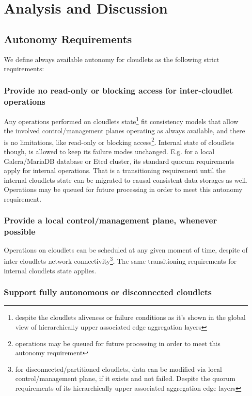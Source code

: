 \documentclass[conference]{IEEEtran}
\begin{document}
\section{Analysis and Discussion}

\subsection{Autonomy Requirements}

We define always available autonomy for cloudlets as the following strict
requirements:

\subsubsection{Provide no read-only or blocking access for inter-cloudlet
operations}

Any operations performed on cloudlets state\footnote{despite the cloudlets
aliveness or failure conditions as it's shown in the global view of
hierarchically upper associated edge aggregation layers} fit consistency models
that allow the involved control/management planes operating as always
available, and there is no limitations, like read-only or blocking
access\footnote{operations may be queued for future processing in order to meet
this autonomy requirement}. Internal state of cloudlets though, is allowed to
keep its failure modes unchanged. E.g. for a local Galera/MariaDB database or
Etcd cluster, its standard quorum requirements apply for internal operations.
That is a transitioning requirement until the internal cloudlets state can be
migrated to causal consistent data storages as well. Operations may be queued
for future processing in order to meet this autonomy requirement.

\subsubsection{Provide a local control/management plane, whenever possible}

Operations on cloudlets can be scheduled at any given moment of time, despite
of inter-cloudlets network connectivity\footnote{for disconnected/partitioned
cloudlets, data can be modified via local control/management plane, if it
exists and not failed. Despite the quorum requirements of its hierarchically
upper associated aggregation edge layers}. The same transitioning requirements
for internal cloudlets state applies.

\subsubsection{Support fully autonomous or disconnected cloudlets}
\end{document}
